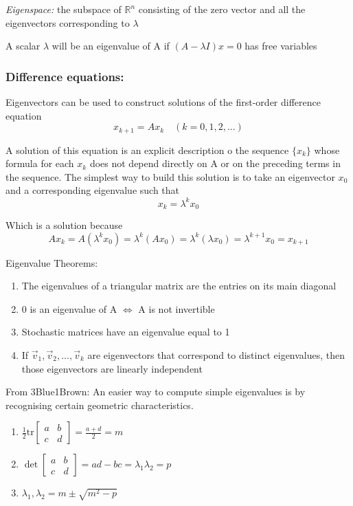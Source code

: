 \documentclass[12pt]{article} %
\newcommand{\R}{\mathbb{R}}
\begin{document}
\emph{Eigenspace:} the subspace of $\R^n$ consisting of the zero vector and all the eigenvectors corresponding to $\lambda$

A scalar $\lambda$ will be an eigenvalue of A if $(A - \lambda I)x = 0$ has free variables

\subsubsection{Difference equations:}
Eigenvectors can be used to construct solutions of the first-order difference equation
$$x_{k+1} = Ax_k \quad (k = 0, 1, 2, ...)$$

A solution of this equation is an explicit description o the sequence $\{x_k\}$ whose formula for each $x_k$ does not depend directly on A or on the preceding terms in the sequence. The simplest way to build this solution is to take an eigenvector $x_0$ and a corresponding eigenvalue such that 
$$x_k = \lambda^k x_0$$

Which is a solution because 
$$Ax_k = A(\lambda^k x_0)= \lambda^k (Ax_0) = \lambda^k (\lambda x_0) = \lambda^{k + 1}x_0 = x_{k+1}$$

Eigenvalue Theorems:
\begin{enumerate}
	\item The eigenvalues of a triangular matrix are the entries on its main diagonal
	\item 0 is an eigenvalue of A $\iff$ A is not invertible
	\item Stochastic matrices have an eigenvalue equal to 1
	\item If $\vec{v}_1, \vec{v}_2, ..., \vec{v}_k$ are eigenvectors that correspond to distinct eigenvalues, then those eigenvectors are linearly independent
\end{enumerate}

From 3Blue1Brown:
An easier way to compute simple eigenvalues is by recognising certain geometric characteristics.
\begin{enumerate}
	\item $\frac{1}{2}\text{tr}\begin{bmatrix}
		a & b\\
		c & d
	\end{bmatrix} = \frac{a + d}{2} = m$
	\item $\det \begin{bmatrix}
		a & b\\
		c & d
	\end{bmatrix} = ad - bc = \lambda_1 \lambda_2 = p$
	\item $\lambda_1 , \lambda_2 = m \pm \sqrt{m^2 - p}$
\end{enumerate}
\end{document}
